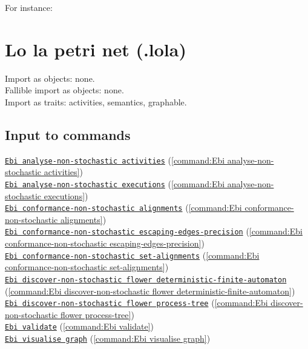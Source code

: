 {    For instance:
    
\clearpage
\section{Lo la petri net (.lola)}
\label{filehandler:LoLa Petri net}
Import as objects: none.
\\Fallible import as objects: none.
\\Import as traits: activities, semantics, graphable.
\subsection*{Input to commands} \null\qquad\hyperref[command:Ebi analyse-non-stochastic activities]{\texttt{Ebi analyse-non-stochastic activities}} (\cref{command:Ebi analyse-non-stochastic activities})\\\null\qquad\hyperref[command:Ebi analyse-non-stochastic executions]{\texttt{Ebi analyse-non-stochastic executions}} (\cref{command:Ebi analyse-non-stochastic executions})\\\null\qquad\hyperref[command:Ebi conformance-non-stochastic alignments]{\texttt{Ebi conformance-non-stochastic alignments}} (\cref{command:Ebi conformance-non-stochastic alignments})\\\null\qquad\hyperref[command:Ebi conformance-non-stochastic escaping-edges-precision]{\texttt{Ebi conformance-non-stochastic escaping-edges-precision}} (\cref{command:Ebi conformance-non-stochastic escaping-edges-precision})\\\null\qquad\hyperref[command:Ebi conformance-non-stochastic set-alignments]{\texttt{Ebi conformance-non-stochastic set-alignments}} (\cref{command:Ebi conformance-non-stochastic set-alignments})\\\null\qquad\hyperref[command:Ebi discover-non-stochastic flower deterministic-finite-automaton]{\texttt{Ebi discover-non-stochastic flower deterministic-finite-automaton}} (\cref{command:Ebi discover-non-stochastic flower deterministic-finite-automaton})\\\null\qquad\hyperref[command:Ebi discover-non-stochastic flower process-tree]{\texttt{Ebi discover-non-stochastic flower process-tree}} (\cref{command:Ebi discover-non-stochastic flower process-tree})\\\null\qquad\hyperref[command:Ebi validate]{\texttt{Ebi validate}} (\cref{command:Ebi validate})\\\null\qquad\hyperref[command:Ebi visualise graph]{\texttt{Ebi visualise graph}} (\cref{command:Ebi visualise graph})
}
